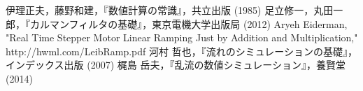 \documentclass[twocolumn,oneside,a4paper]{article}
\begin{document}
\begin{thebibliography}{99}
   伊理正夫，藤野和建，『数値計算の常識』，共立出版 (1985)
   足立修一，丸田一郎，『カルマンフィルタの基礎』，東京電機大学出版局 (2012)
   Aryeh Eiderman, "Real Time Stepper Motor Linear Ramping Just by Addition and Multiplication," http://hwml.com/LeibRamp.pdf
   河村 哲也，『流れのシミュレーションの基礎』，インデックス出版 (2007)
    梶島 岳夫，『乱流の数値シミュレーション』，養賢堂 (2014)
\end{thebibliography}

%    
%	
%	
%
\end{document}
